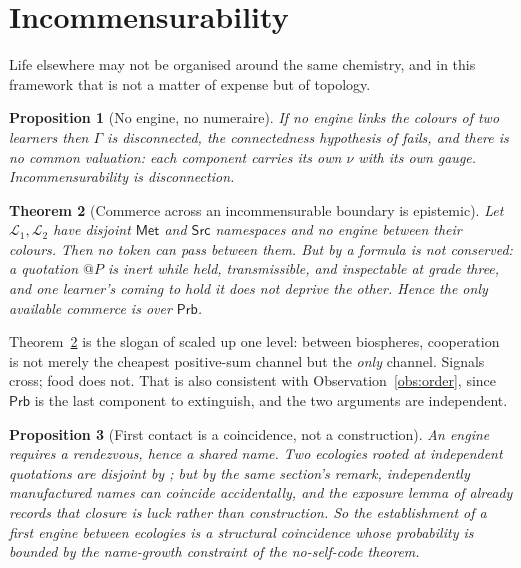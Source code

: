\documentclass[11pt]{article}
\theoremstyle{plain}
\newtheorem{theorem}{Theorem}[section]
\newtheorem{proposition}[theorem]{Proposition}
\theoremstyle{definition}
\theoremstyle{remark}
\newcommand{\Lrn}{\mathcal{L}}
\newcommand{\Met}{\mathsf{Met}}
\newcommand{\Src}{\mathsf{Src}}
\newcommand{\Prb}{\mathsf{Prb}}
\begin{document}
\section{Incommensurability}
\label{sec:incomm}

Life elsewhere may not be organised around the same chemistry, and in this
framework that is not a matter of expense but of topology.

\begin{proposition}[No engine, no numeraire]
If no engine links the colours of two learners then $\Gamma$ is
disconnected, the connectedness hypothesis of \cite[Thm.~3.3]{vtok} fails,
and there is no common valuation: each component carries its own $\nu$ with
its own gauge. Incommensurability is disconnection.
\end{proposition}

\begin{theorem}[Commerce across an incommensurable boundary is epistemic]
\label{thm:epistemic}
Let $\Lrn_1, \Lrn_2$ have disjoint $\Met$ and $\Src$ namespaces and no
engine between their colours. Then no token can pass between them. But by
\cite[Obs.~6.1]{compose} a formula is not conserved: a quotation $@P$
is inert while held, transmissible, and inspectable at grade three, and one
learner's coming to hold it does not deprive the other. Hence the only
available commerce is over $\Prb$.
\end{theorem}

Theorem~\ref{thm:epistemic} is the slogan of \cite[\S6]{compose} scaled up
one level: between biospheres, cooperation is not merely the cheapest
positive-sum channel but the \emph{only} channel. Signals cross; food does
not. That is also consistent with Observation~\ref{obs:order}, since $\Prb$
is the last component to extinguish, and the two arguments are
independent.

\begin{proposition}[First contact is a coincidence, not a construction]
An engine requires a rendezvous, hence a shared name. Two ecologies rooted
at independent quotations are disjoint by
\cite[\S7]{compose}; but by the same section's remark, independently
manufactured names can coincide accidentally, and the exposure lemma of
\cite[\S9]{scientist} already records that closure is luck rather than
construction. So the establishment of a first engine between ecologies is a
structural coincidence whose probability is bounded by the name-growth
constraint of the no-self-code theorem.
\end{proposition}
\end{document}
